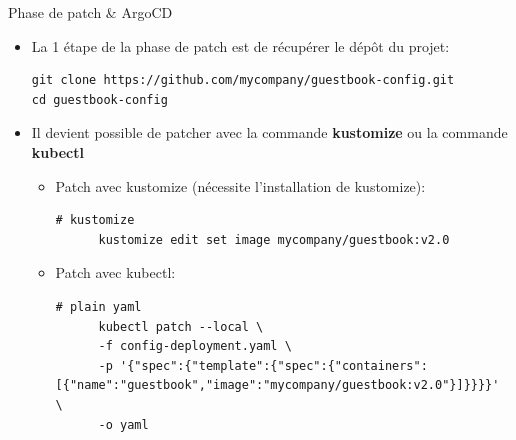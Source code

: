 \begin{frame}[fragile]{Phase de patch \& ArgoCD}

\begin{itemize}
   \item La 1\iere{} étape de la phase de patch est de récupérer le dépôt du projet:
\begin{tiny}
\begin{Verbatim}[commandchars=\&\@\@]
git clone https://github.com/mycompany/guestbook-config.git
cd guestbook-config
\end{Verbatim}
\end{tiny}
   \item Il devient possible de patcher avec la commande \textbf{kustomize} ou la commande \textbf{kubectl}
   \begin{itemize}
         \item Patch avec kustomize (nécessite l'installation de kustomize):
      \begin{tiny}
      \begin{Verbatim}[commandchars=\\\{\}]
      # kustomize
      kustomize edit set image mycompany/guestbook:v2.0
      \end{Verbatim}
      \end{tiny}
         \item Patch avec kubectl:
      \begin{tiny}
      \begin{Verbatim}[commandchars=\&\{\}]
      # plain yaml
      kubectl patch --local \
      -f config-deployment.yaml \
      -p '{"spec":{"template":{"spec":{"containers":[{"name":"guestbook","image":"mycompany/guestbook:v2.0"}]}}}}' \
      -o yaml
      \end{Verbatim}
      \end{tiny}
   \end{itemize}
\end{itemize}

\end{frame}


